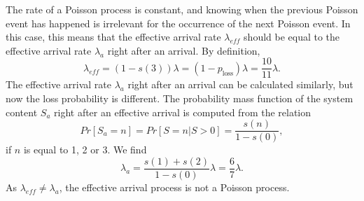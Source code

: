 The rate of a Poisson process is constant, and knowing when the previous Poisson event has happened
is irrelevant for the occurrence of the next Poisson event.
In this case, this means that the effective arrival rate $\lambda_{eff}$ should be equal
to the effective arrival rate $\lambda_{a}$ right after an arrival.
By definition,
    \[
        \lambda_{eff}
        = ( 1 - s(3) ) \lambda = ( 1 - p_{\text{loss}}) \lambda = \frac{10}{11} \lambda.
    \]
    The effective arrival rate $\lambda_a$ right after an arrival can be calculated similarly, but now the loss probability is different.
    The probability mass function of the system content $S_a$ right after an effective arrival is computed from the relation
    \[
        Pr[S_a = n] = Pr[S = n | S > 0] = \frac{s(n)}{1 - s(0)},
    \]
    if $n$ is equal to 1, 2 or 3.
    We find
    \[
        \lambda_a = \frac{s(1) + s(2)}{1 - s(0)} \lambda = \frac{6}{7} \lambda.
    \]
    As $\lambda_{eff} \neq \lambda_a$, the effective arrival process is not a Poisson process.

